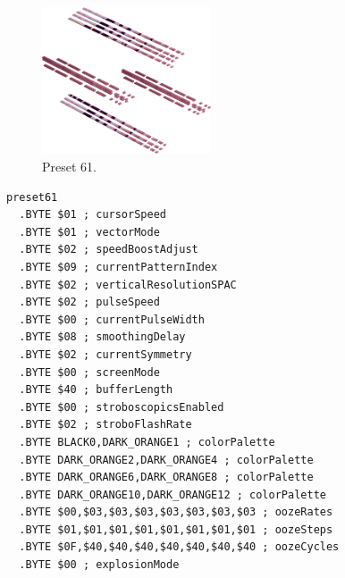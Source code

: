 \begin{minipage}[b]{0.48\linewidth}
\begin{figure}[H]                                                          
  \centering                                                             
  \begin{adjustbox}{width=5cm,center}                                   
  \includegraphics[width=5cm]{src/colorspace_presets/preset61-45.png}%
  \end{adjustbox}                                                        
\caption*{Preset 61.}                                           
\end{figure}                                                               
\end{minipage}
\hspace{0.1cm}
\begin{minipage}[b]{0.48\linewidth}                                       
\begin{lstlisting}[basicstyle=\ttfamily\tiny]
preset61
  .BYTE $01 ; cursorSpeed
  .BYTE $01 ; vectorMode
  .BYTE $02 ; speedBoostAdjust
  .BYTE $09 ; currentPatternIndex
  .BYTE $02 ; verticalResolutionSPAC
  .BYTE $02 ; pulseSpeed
  .BYTE $00 ; currentPulseWidth
  .BYTE $08 ; smoothingDelay
  .BYTE $02 ; currentSymmetry
  .BYTE $00 ; screenMode
  .BYTE $40 ; bufferLength
  .BYTE $00 ; stroboscopicsEnabled
  .BYTE $02 ; stroboFlashRate
  .BYTE BLACK0,DARK_ORANGE1 ; colorPalette
  .BYTE DARK_ORANGE2,DARK_ORANGE4 ; colorPalette
  .BYTE DARK_ORANGE6,DARK_ORANGE8 ; colorPalette
  .BYTE DARK_ORANGE10,DARK_ORANGE12 ; colorPalette
  .BYTE $00,$03,$03,$03,$03,$03,$03,$03 ; oozeRates
  .BYTE $01,$01,$01,$01,$01,$01,$01,$01 ; oozeSteps
  .BYTE $0F,$40,$40,$40,$40,$40,$40,$40 ; oozeCycles
  .BYTE $00 ; explosionMode
\end{lstlisting}
\end{minipage}

